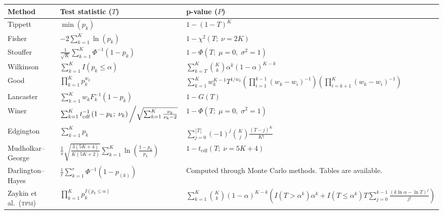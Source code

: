 \begin{table}
\begin{center}
{\footnotesize
\begin{tabular}{@{}m{4.3cm}@{}m{5.7cm}<{\raggedright}@{}m{12.2cm}<{\raggedright}@{}}
\toprule
\textbf{Method} & \textbf{Test statistic ($T$)} & \textbf{p-value ($P$)}\\
\midrule
Tippett &
$\min \left(p_{k}\right)$ &
$1-\left(1-T\right)^{K}$ \\
\midrule[0pt]
Fisher &
$-2 \sum_{k=1}^{K} \ln\left(p_{k}\right)$ &
$1-\chi^{2}\left(T;\;\nu=2K\right)$\\
\midrule[0pt]
Stouffer &
$\frac{1}{\sqrt{K}} \sum_{k=1}^{K} \Phi^{-1}\left(1-p_{k}\right)$ &
$1-\Phi\left(T;\;\mu=0,\;\sigma^2=1\right)$\\
\midrule[0pt]
Wilkinson &
$\sum_{k=1}^{K} I\left(p_{k}\leqslant\alpha\right)$ &
$\sum_{k=T}^{K}\binom{K}{k}\alpha^{k}(1-\alpha)^{K-k}$ \\
\midrule[0pt]
Good &
$\prod_{k=1}^{K} p_{k}^{w_{k}}$ &
$\sum_{k=1}^{K}w_{k}^{K-1}T^{1/w_{k}}\left(\prod_{i=1}^{k-1}\left(w_{k}-w_{i}\right)^{-1}\right) \left(\prod_{i=k+1}^{K}\left(w_{k}-w_{i}\right)^{-1}\right)$\\
\midrule[0pt]
Lancaster &
$\sum_{k=1}^{K} w_{k}F_{k}^{-1}\left(1-p_{k}\right)$ &
$1-G\left(T\right)$\\
\midrule[0pt]
Winer &
$\sum_{k=1}^{K}t_{\text{cdf}}^{-1}\left(1-p_{k};\;\nu_{k}\right)\left/\sqrt{\sum_{k=1}^{K}\frac{\nu_{k}}{\nu_{k}-2}}\right.$ &
$1-\Phi\left(T;\;\mu=0,\;\sigma^2=1\right)$\\
\midrule[0pt]
Edgington &
$\sum_{k=1}^{K} p_{k}$& 
$\sum_{j=0}^{\lfloor T \rfloor}(-1)^j \binom{K}{j}\frac{\left(T-j\right)^K}{K!}$ \\
\midrule[0pt]
Mudholkar--George &
$\frac{1}{\pi}\sqrt{\frac{3(5K+4)}{K(5K+2)}}\sum_{k=1}^{K} \ln\left(\frac{1-p_{k}}{p_{k}}\right)$ &
$1-t_{\text{cdf}}(T;\;\nu=5K+4)$\\
\midrule[0pt]
Darlington--Hayes &
$\frac{1}{r} \sum_{k=1}^{r} \Phi^{-1}\left(1-p_{(k)}\right)$ &
Computed through Monte Carlo methods. Tables are available.\\
\midrule[0pt]
Zaykin et al.\ (\textsc{tpm}) &
$\prod_{k=1}^{K} p_{k}^{I\left(p_{k} \leqslant \alpha\right)}$ &
$\sum_{k=1}^{K}\binom{K}{k}\left(1-\alpha\right)^{K-k}\left(I\left(T> \alpha^{k}\right) \alpha^{k}  + I\left(T\leqslant \alpha^{k}\right)T\sum_{j=0}^{k-1}\frac{\left(k\ln \alpha - \ln T\right)^{j}}{j!}\right)$\\

\end{tabular}}
\end{center}
\end{table}
